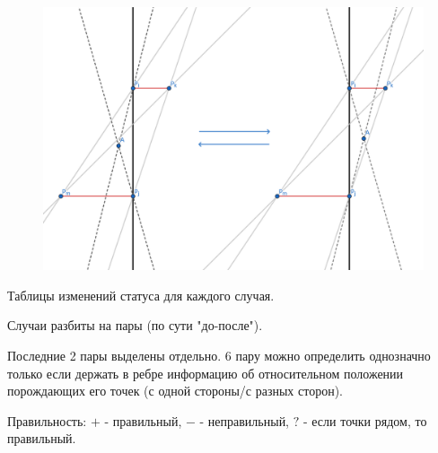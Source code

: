 \documentclass[letterpaper,12pt]{article}
\begin{document}
\begin{enumerate}
            \begin{figure}[H]
                  \centering
                  \includegraphics[width=.6\linewidth]{between_2.png}
            \end{figure}
\end{enumerate}

Таблицы изменений статуса для каждого случая.

Случаи разбиты на пары (по сути "до-после").

Последние 2 пары выделены отдельно. 6 пару можно определить
однозначно только если держать в ребре информацию об относительном 
положении порождающих его точек (с одной стороны/с разных сторон).

Правильность: $+$ - правильный, $-$ - неправильный,
$?$ - если точки рядом, то правильный.
\end{document}
